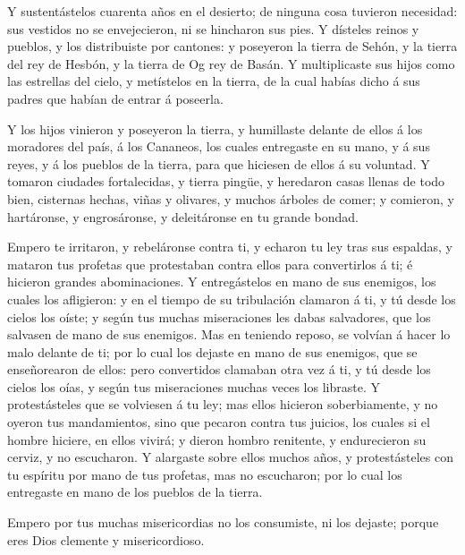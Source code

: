  Y sustentástelos cuarenta años en el desierto; de ninguna
cosa tuvieron necesidad: sus vestidos no se envejecieron, ni se
hincharon sus pies.  Y dísteles reinos y pueblos, y los
distribuiste por cantones: y poseyeron la tierra de Sehón, y la tierra
del rey de Hesbón, y la tierra de Og rey de Basán.  Y
multiplicaste sus hijos como las estrellas del cielo, y metístelos en la
tierra, de la cual habías dicho á sus padres que habían de entrar á
poseerla.

 Y los hijos vinieron y poseyeron la tierra, y humillaste
delante de ellos á los moradores del país, á los Cananeos, los cuales
entregaste en su mano, y á sus reyes, y á los pueblos de la tierra, para
que hiciesen de ellos á su voluntad.  Y tomaron ciudades
fortalecidas, y tierra pingüe, y heredaron casas llenas de todo bien,
cisternas hechas, viñas y olivares, y muchos árboles de comer; y
comieron, y hartáronse, y engrosáronse, y deleitáronse en tu grande
bondad.

 Empero te irritaron, y rebeláronse contra ti, y echaron tu
ley tras sus espaldas, y mataron tus profetas que protestaban contra
ellos para convertirlos á ti; é hicieron grandes abominaciones.
 Y entregástelos en mano de sus enemigos, los cuales los
afligieron: y en el tiempo de su tribulación clamaron á ti, y tú desde
los cielos los oíste; y según tus muchas miseraciones les dabas
salvadores, que los salvasen de mano de sus enemigos.  Mas
en teniendo reposo, se volvían á hacer lo malo delante de ti; por lo
cual los dejaste en mano de sus enemigos, que se enseñorearon de ellos:
pero convertidos clamaban otra vez á ti, y tú desde los cielos los oías,
y según tus miseraciones muchas veces los libraste.  Y
protestásteles que se volviesen á tu ley; mas ellos hicieron
soberbiamente, y no oyeron tus mandamientos, sino que pecaron contra tus
juicios, los cuales si el hombre hiciere, en ellos vivirá; y dieron
hombro renitente, y endurecieron su cerviz, y no escucharon.
 Y alargaste sobre ellos muchos años, y protestásteles con
tu espíritu por mano de tus profetas, mas no escucharon; por lo cual los
entregaste en mano de los pueblos de la tierra.

 Empero por tus muchas misericordias no los consumiste, ni
los dejaste; porque eres Dios clemente y misericordioso.


